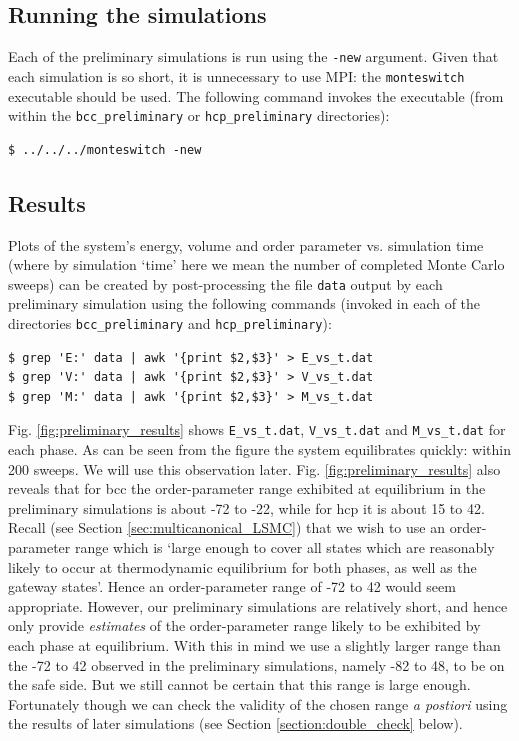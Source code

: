 \documentclass{report}
\begin{document}
\subsection{Running the simulations}
Each of the preliminary simulations is run using the \texttt{-new} argument. Given that each simulation is so short, it is unnecessary to use MPI: the
\texttt{monteswitch} executable should be used. The following command invokes the executable (from within the \texttt{bcc\_preliminary} or 
\texttt{hcp\_preliminary} directories):
\begin{verbatim}
$ ../../../monteswitch -new
\end{verbatim}

\subsection{Results}
Plots of the system's energy, volume and order parameter vs. simulation time (where by simulation `time' here we mean the number of completed Monte Carlo sweeps)
can be created by post-processing the file \texttt{data} output by each preliminary simulation using the following commands (invoked in each of the
directories \texttt{bcc\_preliminary} and \texttt{hcp\_preliminary}):
\begin{verbatim}
$ grep 'E:' data | awk '{print $2,$3}' > E_vs_t.dat
$ grep 'V:' data | awk '{print $2,$3}' > V_vs_t.dat
$ grep 'M:' data | awk '{print $2,$3}' > M_vs_t.dat
\end{verbatim}
Fig. \ref{fig:preliminary_results} shows \texttt{E\_vs\_t.dat}, \texttt{V\_vs\_t.dat} and \texttt{M\_vs\_t.dat} for each phase. As can be seen 
from the figure the system equilibrates quickly: within 200 sweeps. We will use this observation later.
Fig. \ref{fig:preliminary_results} also reveals that for bcc the order-parameter range exhibited at equilibrium in the preliminary simulations is 
about -72 to -22, while for hcp it is about 15 to 42. Recall (see Section \ref{sec:multicanonical_LSMC}) that we wish to use an order-parameter range
which is `large enough to cover all states which are reasonably likely to occur at thermodynamic equilibrium for both phases, as well as the gateway states'.
Hence an order-parameter range of -72 to 42 would seem appropriate. However, our preliminary simulations are relatively short, and hence only provide 
\emph{estimates} of the order-parameter range likely to be exhibited by each phase at equilibrium. With this in mind we use a slightly larger range than 
the -72 to 42 observed in the preliminary simulations, namely -82 to 48, to be on the safe side. But we still cannot be certain that 
this range is large enough. Fortunately though we can check the validity of the chosen range \emph{a postiori} using the results of later simulations (see Section 
\ref{section:double_check} below).
\end{document}
